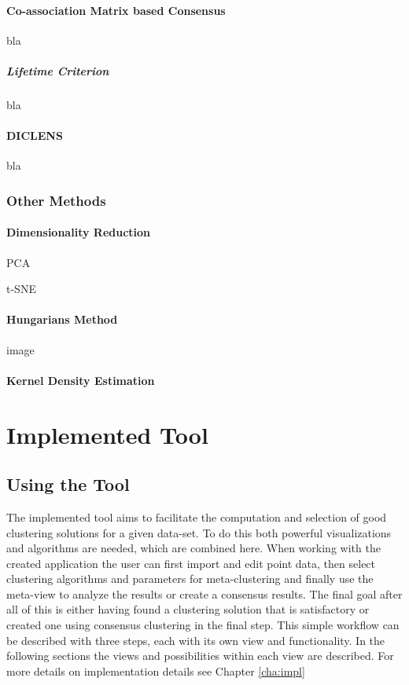 \documentclass[
	a4paper,
	english,
	twoside,
	openright,               
	11pt                            
	]{report}
\begin{document}
\subsection{Co-association Matrix based Consensus}
bla

\subsubsection{Lifetime Criterion}
bla

\subsection{DICLENS}
bla

\section{Other Methods}
\subsection{Dimensionality Reduction}\label{sec:dim_reduction}
PCA \cite{pca}

 t-SNE \cite{Maaten2008VisualizingDU}

\subsection{Hungarians Method}
image 

\subsection{Kernel Density Estimation}

\part{Implemented Tool}
\chapter{Using the Tool}\label{cha:Tool}
The implemented tool aims to facilitate the computation and selection of good clustering solutions for a given data-set. To do this both powerful visualizations and algorithms are needed, which are combined here. When working with the created application the user can first import and edit point data, then select clustering algorithms and parameters for meta-clustering and finally use the meta-view to analyze the results or create a consensus results. The final goal after all of this is either having found a clustering solution that is satisfactory or created one using consensus clustering in the final step. This simple workflow can be described with three steps, each with its own view and functionality. In the following sections the views and possibilities within each view are described. For more details on implementation details see Chapter \ref{cha:impl}
\end{document}
